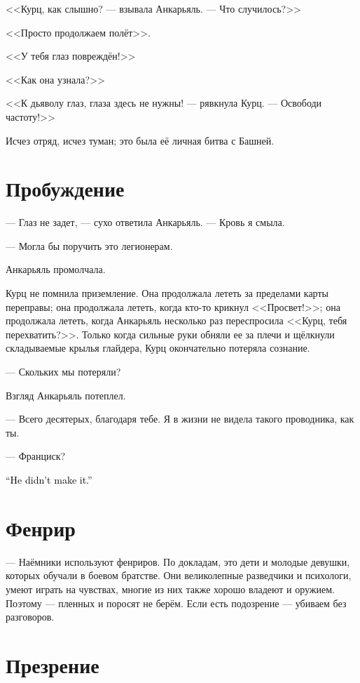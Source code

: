 \documentclass[a4paper,10pt,fleqn]{book}\usepackage{polyglossia}\setdefaultlanguage{english}\setotherlanguage{russian}\defaultfontfeatures{Ligatures=TeX,Mapping=tex-text}\usepackage{xcolor}\definecolor{lightgray}{HTML}{bbbbbb}\color{lightgray}\newcommand{\ml}[3]{\textcolor{black}{#3}}
\begin{document}
<<Курц, как слышно? --- взывала Анкарьяль.
--- Что случилось?>>

<<Просто продолжаем полёт>>.

<<У тебя глаз повреждён!>>

<<Как она узнала?>>

<<К дьяволу глаз, глаза здесь не нужны! --- рявкнула Курц.
--- Освободи частоту!>>

Исчез отряд, исчез туман;
это была её личная битва с Башней.

\section{Пробуждение}

--- Глаз не задет, --- сухо ответила Анкарьяль.
--- Кровь я смыла.

--- Могла бы поручить это легионерам.

Анкарьяль промолчала.

Курц не помнила приземление.
Она продолжала лететь за пределами карты переправы;
она продолжала лететь, когда кто-то крикнул <<Просвет!>>;
она продолжала лететь, когда Анкарьяль несколько раз переспросила <<Курц, тебя перехватить?>>.
Только когда сильные руки обняли ее за плечи и щёлкнули складываемые крылья глайдера, Курц окончательно потеряла сознание.

--- Скольких мы потеряли?

Взгляд Анкарьяль потеплел.

--- Всего десятерых, благодаря тебе.
Я в жизни не видела такого проводника, как ты.

--- Франциск?

\ml{$0$}
{--- Он не выбрался.}
{``He didn't make it.''}

\section{Фенрир}

--- Наёмники используют фенриров.
По докладам, это дети и молодые девушки, которых обучали в боевом братстве.
Они великолепные разведчики и психологи, умеют играть на чувствах, многие из них также хорошо владеют и оружием.
Поэтому --- пленных и поросят не берём.
Если есть подозрение --- убиваем без разговоров.

\section{Презрение}
\end{document}
